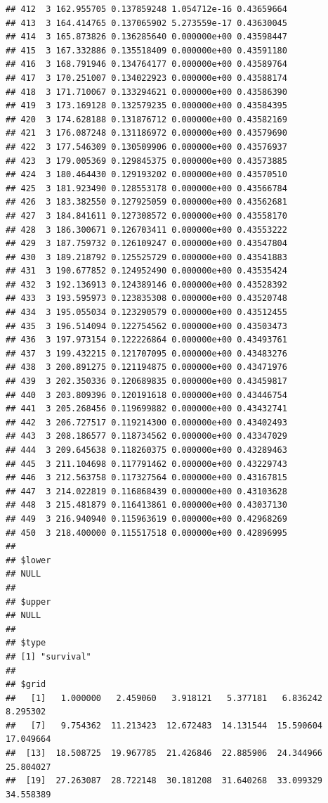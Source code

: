\documentclass[article]{jss}\usepackage[]{graphicx}\usepackage[]{xcolor}
\makeatletter
\newenvironment{kframe}{%
 \def\at@end@of@kframe{}%
 \ifinner\ifhmode%
  \def\at@end@of@kframe{\end{minipage}}%
  \begin{minipage}{\columnwidth}%
 \fi\fi%
 \def\FrameCommand##1{\hskip\@totalleftmargin \hskip-\fboxsep
 \colorbox{shadecolor}{##1}\hskip-\fboxsep
     \hskip-\linewidth \hskip-\@totalleftmargin \hskip\columnwidth}%
 \MakeFramed {\advance\hsize-\width
   \@totalleftmargin\z@ \linewidth\hsize
   \@setminipage}}%
 {\par\unskip\endMakeFramed%
 \at@end@of@kframe}
\newenvironment{knitrout}{}{} %
\makeatother
\begin{document}
\begin{knitrout}
\begin{kframe}
\begin{verbatim}
## 412  3 162.955705 0.137859248 1.054712e-16 0.43659664
## 413  3 164.414765 0.137065902 5.273559e-17 0.43630045
## 414  3 165.873826 0.136285640 0.000000e+00 0.43598447
## 415  3 167.332886 0.135518409 0.000000e+00 0.43591180
## 416  3 168.791946 0.134764177 0.000000e+00 0.43589764
## 417  3 170.251007 0.134022923 0.000000e+00 0.43588174
## 418  3 171.710067 0.133294621 0.000000e+00 0.43586390
## 419  3 173.169128 0.132579235 0.000000e+00 0.43584395
## 420  3 174.628188 0.131876712 0.000000e+00 0.43582169
## 421  3 176.087248 0.131186972 0.000000e+00 0.43579690
## 422  3 177.546309 0.130509906 0.000000e+00 0.43576937
## 423  3 179.005369 0.129845375 0.000000e+00 0.43573885
## 424  3 180.464430 0.129193202 0.000000e+00 0.43570510
## 425  3 181.923490 0.128553178 0.000000e+00 0.43566784
## 426  3 183.382550 0.127925059 0.000000e+00 0.43562681
## 427  3 184.841611 0.127308572 0.000000e+00 0.43558170
## 428  3 186.300671 0.126703411 0.000000e+00 0.43553222
## 429  3 187.759732 0.126109247 0.000000e+00 0.43547804
## 430  3 189.218792 0.125525729 0.000000e+00 0.43541883
## 431  3 190.677852 0.124952490 0.000000e+00 0.43535424
## 432  3 192.136913 0.124389146 0.000000e+00 0.43528392
## 433  3 193.595973 0.123835308 0.000000e+00 0.43520748
## 434  3 195.055034 0.123290579 0.000000e+00 0.43512455
## 435  3 196.514094 0.122754562 0.000000e+00 0.43503473
## 436  3 197.973154 0.122226864 0.000000e+00 0.43493761
## 437  3 199.432215 0.121707095 0.000000e+00 0.43483276
## 438  3 200.891275 0.121194875 0.000000e+00 0.43471976
## 439  3 202.350336 0.120689835 0.000000e+00 0.43459817
## 440  3 203.809396 0.120191618 0.000000e+00 0.43446754
## 441  3 205.268456 0.119699882 0.000000e+00 0.43432741
## 442  3 206.727517 0.119214300 0.000000e+00 0.43402493
## 443  3 208.186577 0.118734562 0.000000e+00 0.43347029
## 444  3 209.645638 0.118260375 0.000000e+00 0.43289463
## 445  3 211.104698 0.117791462 0.000000e+00 0.43229743
## 446  3 212.563758 0.117327564 0.000000e+00 0.43167815
## 447  3 214.022819 0.116868439 0.000000e+00 0.43103628
## 448  3 215.481879 0.116413861 0.000000e+00 0.43037130
## 449  3 216.940940 0.115963619 0.000000e+00 0.42968269
## 450  3 218.400000 0.115517518 0.000000e+00 0.42896995
## 
## $lower
## NULL
## 
## $upper
## NULL
## 
## $type
## [1] "survival"
## 
## $grid
##   [1]   1.000000   2.459060   3.918121   5.377181   6.836242   8.295302
##   [7]   9.754362  11.213423  12.672483  14.131544  15.590604  17.049664
##  [13]  18.508725  19.967785  21.426846  22.885906  24.344966  25.804027
##  [19]  27.263087  28.722148  30.181208  31.640268  33.099329  34.558389

\end{verbatim}
\end{kframe}
\end{knitrout}
\end{document}
